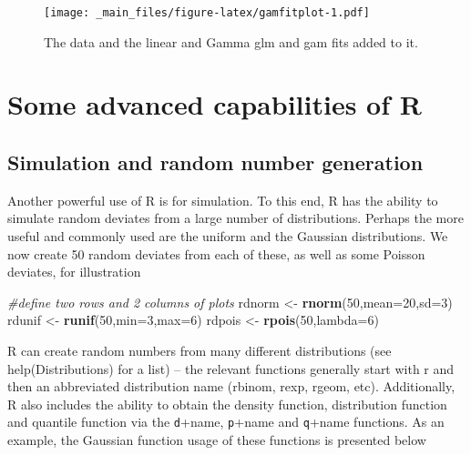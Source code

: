 \documentclass[]{book}
\newenvironment{Shaded}{\begin{snugshade}}{\end{snugshade}}
\newcommand{\KeywordTok}[1]{\textcolor[rgb]{0.13,0.29,0.53}{\textbf{#1}}}
\newcommand{\DataTypeTok}[1]{\textcolor[rgb]{0.13,0.29,0.53}{#1}}
\newcommand{\DecValTok}[1]{\textcolor[rgb]{0.00,0.00,0.81}{#1}}
\newcommand{\StringTok}[1]{\textcolor[rgb]{0.31,0.60,0.02}{#1}}
\newcommand{\CommentTok}[1]{\textcolor[rgb]{0.56,0.35,0.01}{\textit{#1}}}
\newcommand{\NormalTok}[1]{#1}
\theoremstyle{definition}
\theoremstyle{definition}
\theoremstyle{remark}
\begin{document}
\begin{figure}
\centering
\texttt{[image: \_main\_files/figure-latex/gamfitplot-1.pdf]}
\caption{\label{fig:gamfitplot}The data and the linear and Gamma glm and gam
fits added to it.}
\end{figure}

\section{Some advanced capabilities of
R}\label{some-advanced-capabilities-of-r}

\subsection{Simulation and random number
generation}\label{simulation-and-random-number-generation}

Another powerful use of R is for simulation. To this end, R has the
ability to simulate random deviates from a large number of
distributions. Perhaps the more useful and commonly used are the uniform
and the Gaussian distributions. We now create 50 random deviates from
each of these, as well as some Poisson deviates, for illustration

\begin{Shaded}
\begin{Highlighting}[]
\CommentTok{#define two rows and 2 columns of plots}
\NormalTok{rdnorm <-}\StringTok{ }\KeywordTok{rnorm}\NormalTok{(}\DecValTok{50}\NormalTok{,}\DataTypeTok{mean=}\DecValTok{20}\NormalTok{,}\DataTypeTok{sd=}\DecValTok{3}\NormalTok{)}
\NormalTok{rdunif <-}\StringTok{ }\KeywordTok{runif}\NormalTok{(}\DecValTok{50}\NormalTok{,}\DataTypeTok{min=}\DecValTok{3}\NormalTok{,}\DataTypeTok{max=}\DecValTok{6}\NormalTok{)}
\NormalTok{rdpois <-}\StringTok{ }\KeywordTok{rpois}\NormalTok{(}\DecValTok{50}\NormalTok{,}\DataTypeTok{lambda=}\DecValTok{6}\NormalTok{)}
\end{Highlighting}
\end{Shaded}

R can create random numbers from many different distributions (see
help(Distributions) for a list) -- the relevant functions generally
start with r and then an abbreviated distribution name (rbinom, rexp,
rgeom, etc). Additionally, R also includes the ability to obtain the
density function, distribution function and quantile function via the
\texttt{d}+name, \texttt{p}+name and \texttt{q}+name functions. As an
example, the Gaussian function usage of these functions is presented
below
\end{document}
